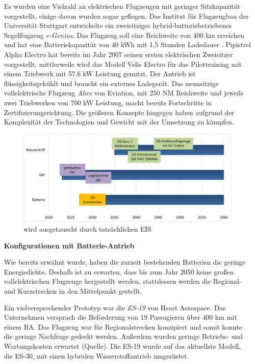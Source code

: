 Es wurden eine Vielzahl an elektrischen Flugzeugen mit geringer 
Sitzkapazität vorgestellt, einige davon wurden sogar geflogen.
Das Institut für Flugzeugbau der Universität Stuttgart entwickelte 
ein zweisitziges hybrid-batteriebetriebenes Segelflugzeug \textit{e-Genius}. 
Das Flugzeug soll eine Reichweite von 400 km erreichen und hat eine 
Batteriekapazität von 40 kWh mit 1,5 Stunden Ladedauer \cite{IFB_eGenius_2025}.
Pipistrel Alpha Electro hat bereits im Jahr 2007 seinen ersten elektrischen Zweisitzer vorgestellt, 
mittlerweile wird das Modell \glqq Velis Electro \grqq{} \cite{Pipistrel_VelisElectro} für 
das Pilottraining mit einem Triebwerk mit 57.6 kW Leistung genutzt. 
Der Antrieb ist flüssigkeitsgekühlt und braucht ein externes Ladegerät. 
Das neunsitzige vollelektrische Flugzeug \textit{Alice} von Eviation, 
mit 250 NM Reichweite und jeweils zwei Triebwerken von 700 kW Leistung,
macht bereits Fortschritte in Zertifizierungsrichtung.
%
Die größeren Konzepte hingegen haben aufgrund der Komplexität der Technologien 
und Gewicht mit der Umsetzung zu kämpfen.\\
\begin{figure}[h]
	\centering
	\includegraphics[width=0.7\linewidth]{Bilder/eis.png}
	\caption[Eintrittsjahren ]{ wird ausgetauscht durch tatsächlichen EIS}
	\label{eis_konzepte}
\end{figure}

\textbf{Konfigurationen mit Batterie-Antrieb}

Wie bereits erwähnt wurde, haben die zurzeit bestehenden Batterien die geringe Energiedichte. 
Deshalb ist zu erwarten, dass bis zum Jahr 2050 keine großen vollelektrischen Flugzeuge hergestellt werden, %
stattdessen werden die Regional- und Kurzstrecken in den Mittelpunkt gestellt.

Ein vielversprechender Prototyp war die \textit{ES-19} von Heart Aerospace. 
Das Unternehmen versprach die Beförderung von 19 Passagieren über 400 km mit einem BA. 
Das Flugzeug war für Regionalstrecken konzipiert und 
somit konnte die geringe Nachfrage gedeckt werden. 
Außerdem wurden geringe Betriebs- und Wartungskosten erwartet (Quelle).
Die ES-19 wurde auf das aktuellste Modell, die ES-30, 
mit einen hybriden Wasserstoffantrieb umgerüstet.

